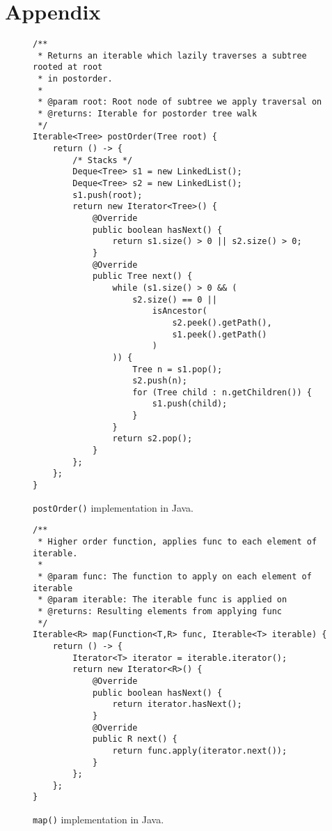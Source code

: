 \documentclass[abstracton,12pt]{scrartcl}
\theoremstyle{definition}
\begin{document}
\newpage




\newpage

\section{Appendix}

\begin{figure}[H]
  \centering
  \small
  \begin{framed}
\begin{verbatim}
/**
 * Returns an iterable which lazily traverses a subtree rooted at root
 * in postorder.
 *
 * @param root: Root node of subtree we apply traversal on
 * @returns: Iterable for postorder tree walk
 */
Iterable<Tree> postOrder(Tree root) {
    return () -> {
        /* Stacks */
        Deque<Tree> s1 = new LinkedList();
        Deque<Tree> s2 = new LinkedList();
        s1.push(root);
        return new Iterator<Tree>() {
            @Override
            public boolean hasNext() {
                return s1.size() > 0 || s2.size() > 0;
            }
            @Override
            public Tree next() {
                while (s1.size() > 0 && (
                    s2.size() == 0 ||
                        isAncestor(
                            s2.peek().getPath(),
                            s1.peek().getPath()
                        )
                )) {
                    Tree n = s1.pop();
                    s2.push(n);
                    for (Tree child : n.getChildren()) {
                        s1.push(child);
                    }
                }
                return s2.pop();
            }          
        };
    };
}
\end{verbatim}
  \end{framed}
  \caption{\texttt{postOrder()} implementation in Java.}
  \label{fig:java_postorder}
\end{figure}

\begin{figure}[h]
  \begin{framed}
\begin{verbatim}
/**
 * Higher order function, applies func to each element of iterable.
 *
 * @param func: The function to apply on each element of iterable
 * @param iterable: The iterable func is applied on
 * @returns: Resulting elements from applying func
 */
Iterable<R> map(Function<T,R> func, Iterable<T> iterable) {
    return () -> {
        Iterator<T> iterator = iterable.iterator();
        return new Iterator<R>() {
            @Override
            public boolean hasNext() {
                return iterator.hasNext();
            }
            @Override
            public R next() {
                return func.apply(iterator.next());
            }
        };
    };
}
\end{verbatim}
  \end{framed}
  \caption{\texttt{map()} implementation in Java.}
  \label{fig:java_map}
\end{figure}
\end{document}

